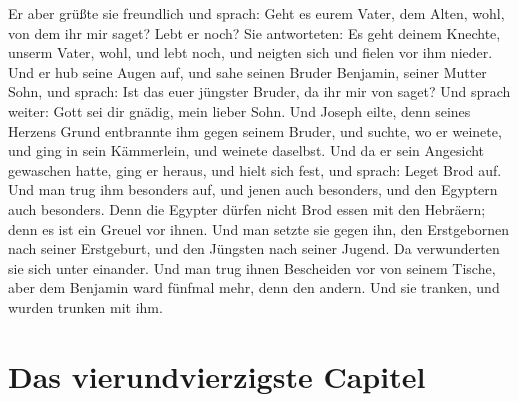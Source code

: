 Er aber grüßte sie freundlich und sprach: Geht es eurem Vater, dem Alten, wohl, von dem ihr mir saget? Lebt er noch? Sie antworteten: Es geht deinem Knechte, unserm Vater, wohl, und lebt noch, und neigten sich und fielen vor ihm nieder. Und er hub seine Augen auf, und sahe seinen Bruder Benjamin, seiner Mutter Sohn, und sprach: Ist das euer jüngster Bruder, da ihr mir von saget? Und sprach weiter: Gott sei dir gnädig, mein lieber Sohn. Und Joseph eilte, denn seines Herzens Grund entbrannte ihm gegen seinem Bruder, und suchte, wo er weinete, und ging in sein Kämmerlein, und weinete daselbst. Und da er sein Angesicht gewaschen hatte, ging er heraus, und hielt sich fest, und sprach: Leget Brod auf. Und man trug ihm besonders auf, und jenen auch besonders, und den Egyptern auch besonders. Denn die Egypter dürfen nicht Brod essen mit den Hebräern; denn es ist ein Greuel vor ihnen. Und man setzte sie gegen ihn, den Erstgebornen nach seiner Erstgeburt, und den Jüngsten nach seiner Jugend. Da verwunderten sie sich unter einander. Und man trug ihnen Bescheiden vor von seinem Tische, aber dem Benjamin ward fünfmal mehr, denn den andern. Und sie tranken, und wurden trunken mit ihm.

\section{Das vierundvierzigste Capitel}

